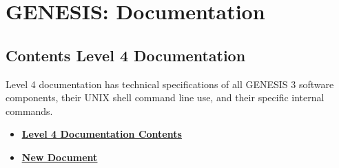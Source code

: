 \documentclass[12pt]{article}
\begin{document}
\section*{GENESIS: Documentation}

\subsection*{Contents Level 4 Documentation}


Level 4 documentation has technical specifications of all GENESIS 3
software components, their UNIX shell command line use, and their
specific internal commands.

\begin{itemize}

\item \href{../contents-level4/contents-level4.pdf}{\bf \underline{Level 4 Documentation Contents}}

\item \href{../g-tube-development-overview/g-tube-development-overview.pdf}{\bf \underline{New Document}}


\end{itemize}

\end{document}
